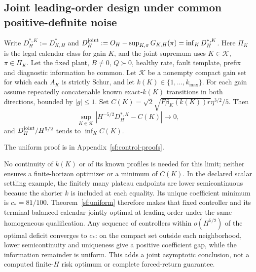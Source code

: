 \subsection{Joint leading-order design under common positive-definite noise}
\begin{theorem}\label{sf:uniform}
Write $D_H^{*,K}:=D_{K,H}^*$ and
$D_H^{\rm joint}:=O_H-\sup_{K,\pi}G_{K,H}(\pi)=\inf_KD_H^{*,K}$.
Here $\Pi_K$ is the legal calendar class for gain $K$, and the joint supremum
uses $K\in\mathcal K$, $\pi\in\Pi_K$. Let the fixed plant, $B\ne0$,
$Q\succ0$, healthy rate, fault template,
prefix and diagnostic information be common. Let $\mathcal K$ be a nonempty
compact gain set for which each $A_K$ is strictly Schur, and let
$k(K)\in\{1,\ldots,k_{\max}\}$. For each gain assume repeatedly concatenable
known exact-$k(K)$ transitions in both directions, bounded by $|g|\le1$.
Set $C(K)=\sqrt2\sqrt{F\beta_K(k(K))r}\eta^{3/2}/5$. Then
\[
\sup_{K\in\mathcal K}|H^{-5/2}D_H^{*,K}-C(K)|\longrightarrow0,
\]
and $D_H^{\rm joint}/H^{5/2}$ tends to $\inf_K C(K)$.
\end{theorem}
The uniform proof is in Appendix~\ref{sf:control-proofs}.

No continuity of $k(K)$ or of its known profiles is needed for this limit;
neither ensures a finite-horizon optimizer or a minimum of $C(K)$.
In the declared scalar settling example, the finitely many plateau endpoints
are lower semicontinuous because the shorter $k$ is included at each equality.
Its unique coefficient minimum is $c_*=81/100$.
Theorem~\ref{sf:uniform} therefore makes that fixed controller and its
terminal-balanced calendar jointly optimal at leading order under the same
homogeneous qualification. Any sequence of controllers within
$o(H^{5/2})$ of the optimal deficit converges to $c_*$: on the compact set
outside each neighborhood, lower semicontinuity and uniqueness give a positive
coefficient gap, while the information remainder is uniform.
This adds a joint asymptotic conclusion, not a computed finite-$H$ risk optimum
or complete forced-return guarantee.

